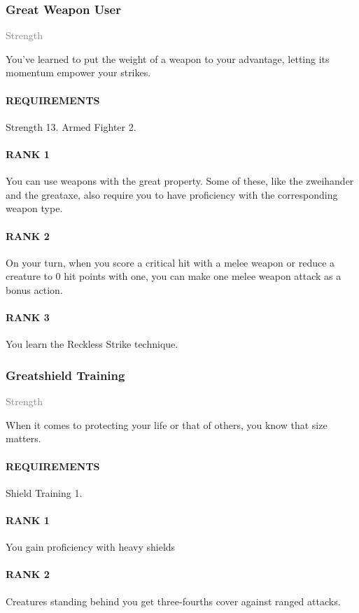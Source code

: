 \subsubsection{Great Weapon User} \label{feat::greatweaponuser}
\small{\textcolor{gray}{Strength}}

\normalsize
You've learned to put the weight of a weapon to your advantage, letting its momentum empower your strikes.
\paragraph{REQUIREMENTS} Strength 13. Armed Fighter 2.
\paragraph{RANK 1} You can use weapons with the great property.
Some of these, like the zweihander and the greataxe, also require you to have proficiency with the corresponding weapon type.
\paragraph{RANK 2} On your turn, when you score a critical hit with a melee weapon or reduce a creature to 0 hit points with one, you can make one melee weapon attack as a bonus action.
\paragraph{RANK 3} You learn the Reckless Strike technique.

\subsubsection{Greatshield Training} \label{feat::greatshieldtraining}
\small{\textcolor{gray}{Strength}}

\normalsize
When it comes to protecting your life or that of others, you know that size matters.
\paragraph{REQUIREMENTS} Shield Training 1.
\paragraph{RANK 1} You gain proficiency with heavy shields
\paragraph{RANK 2} Creatures standing behind you get three-fourths cover against ranged attacks.
